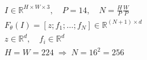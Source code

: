 \documentclass[border=7pt]{standalone}
\begin{document}
\color{ink}
$\displaystyle \begin{gathered}
I\in\mathbb R^{H\times W\times3},\quad P=14,\quad N=\frac{H}{P}\frac{W}{P}\\
F_\theta(I)=[z;f_1;\ldots;f_N]\in\mathbb R^{(N+1)\times d}\\
z\in\mathbb R^d,\quad f_i\in\mathbb R^d\\
H=W=224\;\Longrightarrow\;N=16^2=256
\end{gathered}$
\end{document}

